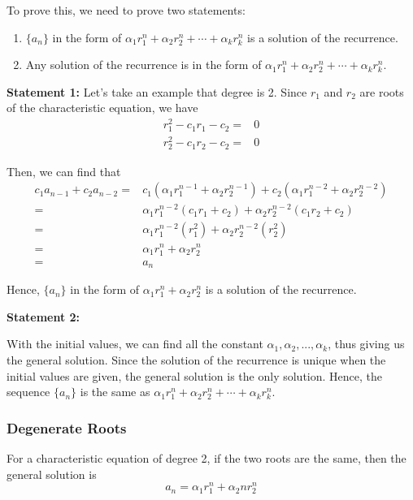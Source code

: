 \documentclass[a4paper,12pt]{article}
\begin{document}
To prove this, we need to prove two statements:
\begin{enumerate}
	\item $\{a_n\}$ in the form of $\alpha_1 r_1^n + \alpha_2 r_2^n + \cdots + \alpha_k r_k^n$ is a solution of the recurrence.
	\item Any solution of the recurrence is in the form of $\alpha_1 r_1^n + \alpha_2 r_2^n + \cdots + \alpha_k r_k^n$.
\end{enumerate}

\textbf{Statement 1:}
Let's take an example that degree is 2.
Since $r_1$ and $r_2$ are roots of the characteristic equation, we have
\begin{align*}
	r_1^2 - c_1 r_1 - c_2 =& 0 \\
	r_2^2 - c_1 r_2 - c_2 =& 0
\end{align*}

Then, we can find that
\begin{align*}
	c_1 a_{n-1} + c_2 a_{n-2} =& c_1 (\alpha_1 r_1^{n-1} + \alpha_2 r_2^{n-1}) + c_2 (\alpha_1 r_1^{n-2} + \alpha_2 r_2^{n-2}) \\
	=& \alpha_1 r_1^{n-2} (c_1 r_1 + c_2) + \alpha_2 r_2^{n-2} (c_1 r_2 + c_2) \\
	=& \alpha_1 r_1^{n-2} (r_1^2) + \alpha_2 r_2^{n-2} (r_2^2) \\
	=& \alpha_1 r_1^n + \alpha_2 r_2^n \\
	=& a_n
\end{align*}

Hence, $\{a_n\}$ in the form of $\alpha_1 r_1^n + \alpha_2 r_2^n$ is a solution of the recurrence.

\textbf{Statement 2:}

With the initial values, we can find all the constant $\alpha_1, \alpha_2, ..., \alpha_k$, thus giving us the general solution.
Since the solution of the recurrence is unique when the initial values are given, the general solution is the only solution.
Hence, the sequence $\{a_n\}$ is the same as $\alpha_1 r_1^n + \alpha_2 r_2^n + \cdots + \alpha_k r_k^n$.

\subsubsection{Degenerate Roots}

For a characteristic equation of degree 2, if the two roots are the same, then the general solution is
\begin{equation*}
	a_n = \alpha_1 r_1^n + \alpha_2 n r_2^n
\end{equation*}
\end{document}
